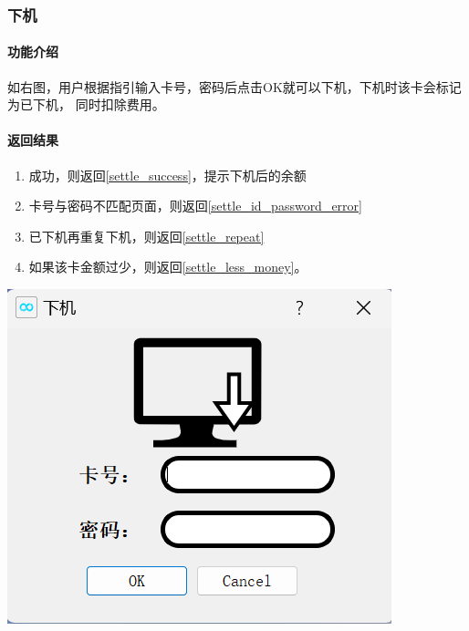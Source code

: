 \documentclass{article}
\begin{document}
    \subsubsection{下机}
    \begin{minipage}[h]{0.5\linewidth}
        \paragraph{功能介绍}
        如右图，用户根据指引输入卡号，密码后点击OK就可以下机，下机时该卡会标记为已下机，
        同时扣除费用。
        \vfill
        \paragraph{返回结果}
        \begin{enumerate}
            \item 成功，则返回\ref{settle_success}，提示下机后的余额
            \item 卡号与密码不匹配页面，则返回\ref{settle_id_password_error}
            \item 已下机再重复下机，则返回\ref{settle_repeat}
            \item 如果该卡金额过少，则返回\ref{settle_less_money}。
        \end{enumerate}
    \end{minipage}
    \begin{minipage}[h]{0.5\linewidth}
        \centering
        \includegraphics[scale=0.6]{figure/settle.png}
        \label{settle}
    \end{minipage}
\end{document}
